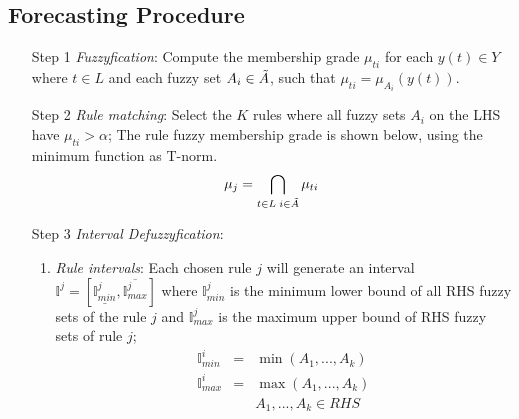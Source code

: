 \subsection{Forecasting Procedure} 
\label{sec:ifts_forecasting_procedure}

\begin{enumerate}
\item [Step 1] \textit{Fuzzyfication}: Compute the membership grade $\mu_{ti}$ for each $y(t) \in Y$ where $t \in L$ and each fuzzy set $A_i \in \Tilde{A}$, such that $\mu_{ti} = \mu_{A_i}(y(t))$. 
\item [Step 2] \textit{Rule matching}: Select the $K$ rules where all fuzzy sets $A_i$ on the LHS have $\mu_{ti} > \alpha$; The rule fuzzy membership grade is shown below, using the minimum function as T-norm.
\begin{equation}
    \mu_j = \bigcap_{t\in L\; i \in \Tilde{A}} \mu_{ti}
\end{equation}

\item [Step 3] \textit{Interval Defuzzyfication}:
\begin{enumerate}
\item \textit{Rule intervals}: Each chosen rule $j$ will generate an interval $\mathbb{I}^j = [\underline{\mathbb{I}^j_{min}}, \overline{\mathbb{I}^j_{max}}]$ where $\mathbb{I}^j_{min}$ is the minimum lower bound of all RHS fuzzy sets of the rule $j$ and $\mathbb{I}^j_{max}$ is the maximum upper bound of RHS fuzzy sets of rule $j$;
\begin{equation}
\begin{array}{lcr}
\mathbb{I}^i_{min} & = & \min( A_1, ..., A_k ) \\
\mathbb{I}^i_{max} & = & \max( A_1, ..., A_k ) \\ 
& & A_1, ..., A_k \in RHS 
\end{array}
\label{eqn:iminimax}
\end{equation}


\end{enumerate}
\end{enumerate}
